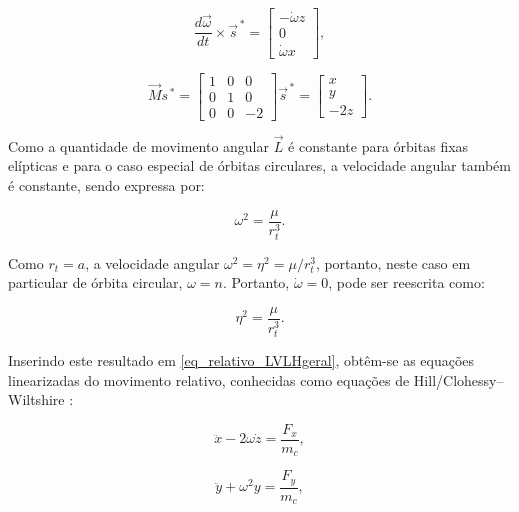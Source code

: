 \begin{equation}
\label{eq_dOmega_cross_s}
\frac{d\vec\omega}{dt} \times \vec s^{\,*} 
=
\begin{bmatrix}
-\dot\omega z \\
0              \\
\dot\omega x
\end{bmatrix},
\end{equation}

\begin{equation}
\label{eq_jacobiana_LVLH}
\vec{M}s^{\,*} 
=
\begin{bmatrix}
    1 & 0 & 0 \\
    0 & 1 & 0  \\
    0 & 0 & -2
\end{bmatrix}
\vec s^{\,*} 
=
\begin{bmatrix}
x \\
y \\
-2z
\end{bmatrix}.
\end{equation}

Como a quantidade de movimento angular $\vec{L}$ é constante para órbitas fixas elípticas e para o caso especial de órbitas circulares, a velocidade angular também é constante, sendo expressa por:

\begin{equation}
\label{eq_omega_constante1}
\omega^2 = \frac{\mu}{r_t^3}.
\end{equation}

Como $r_t=a$, a velocidade angular $\omega^{2}= \eta^2 = \mu/r_t^{3}$, portanto, neste caso em particular de órbita circular, $\omega=n$.
Portanto, $\dot{\omega}=0$, pode ser reescrita como:

\begin{equation}
\label{eq_omega_constante2}
\eta^2 = \frac{\mu}{r_t^3}.
\end{equation}

Inserindo este resultado em \eqref{eq_relativo_LVLHgeral}, obtêm-se as equações linearizadas do movimento relativo, conhecidas como equações de Hill/Clohessy--Wiltshire \cite{hill1878,fehse2003,wie2008space}:

\begin{equation}
    \label{eq_equacoes_HillX}
\ddot{x} - 2\omega \dot{z} = \frac{F_x}{m_c},
\end{equation}

\begin{equation}
    \label{eq_equacoes_HillY}
\ddot{y} + \omega^2 y = \frac{F_y}{m_c},
\end{equation}

